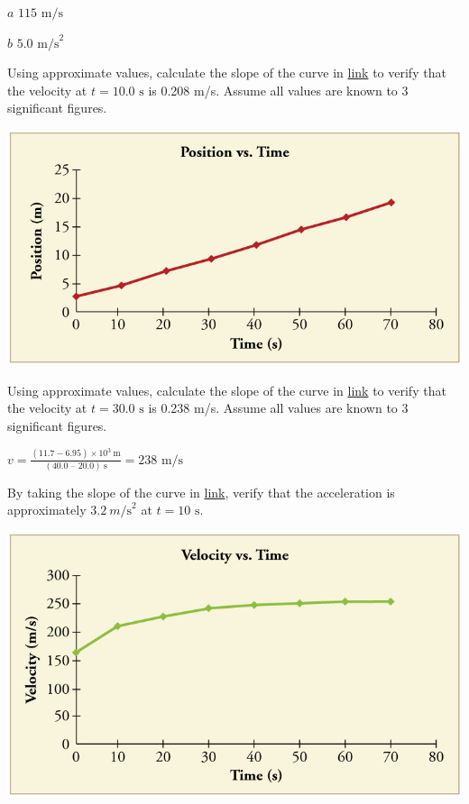 \documentclass[
]{book}
\begin{document}
\leavevmode{}%
\(a\) \(\text{115\ m/s}{}\)

\(b\) \({5\text{.}\text{0\ m/s}^{2}}{}\)

\hypertarget{fs-id4012994}{}
\leavevmode{}%
Using approximate values, calculate the slope of the curve in
\protect\hyperlink{import-auto-id4122996}{link} to verify that
the velocity at \({t = \text{10.0\ s}}{}\) is 0.208 m/s. Assume all values
are known to 3 significant figures.

\includegraphics{images/Figure_02_08Sol_13.jpg}

\hypertarget{fs-id1770908}{}
\leavevmode{}%
Using approximate values, calculate the slope of the curve in
\protect\hyperlink{import-auto-id4122996}{link} to verify that
the velocity at \(t = \text{30.0\ s}\) is 0.238 m/s. Assume all values are
known to 3 significant figures.

\leavevmode{}%
\({v = \frac{(\text{11.7} - 6.95) \times \text{10}^{3}\ \text{m}}{(40\text{.}\text{0\ –\ 20}.0)\ \text{s}}} = \text{238\ m/s}\)

\hypertarget{fs-id2475925}{}
\leavevmode{}%
By taking the slope of the curve in
\protect\hyperlink{import-auto-id3552017}{link}, verify that the
acceleration is approximately \({3\text{.}2\ m\text{/s}^{2}}{}\) at
\({t = \text{10\ s}}{}\).

\includegraphics{images/Figure_02_08Sol_14.jpg}
\end{document}
